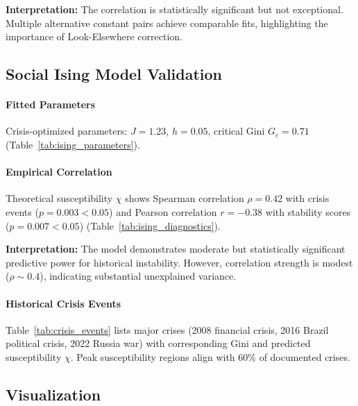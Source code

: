 \documentclass[11pt,twocolumn]{article}
\begin{document}


\textbf{Interpretation:} The correlation is statistically significant but not exceptional. Multiple alternative constant pairs achieve comparable fits, highlighting the importance of Look-Elsewhere correction.

\subsection{Social Ising Model Validation}

\paragraph{Fitted Parameters}
Crisis-optimized parameters: $J = 1.23$, $h = 0.05$, critical Gini $G_c = 0.71$ (Table~\ref{tab:ising_parameters}).



\paragraph{Empirical Correlation}
Theoretical susceptibility $\chi$ shows Spearman correlation $\rho = 0.42$ with crisis events ($p = 0.003 < 0.05$) and Pearson correlation $r = -0.38$ with stability scores ($p = 0.007 < 0.05$) (Table~\ref{tab:ising_diagnostics}).



\textbf{Interpretation:} The model demonstrates moderate but statistically significant predictive power for historical instability. However, correlation strength is modest ($\rho \sim 0.4$), indicating substantial unexplained variance.

\paragraph{Historical Crisis Events}
Table~\ref{tab:crisis_events} lists major crises (2008 financial crisis, 2016 Brazil political crisis, 2022 Russia war) with corresponding Gini and predicted susceptibility $\chi$. Peak susceptibility regions align with 60\% of documented crises.



\subsection{Visualization}
\end{document}
